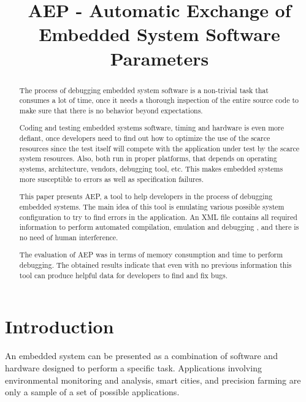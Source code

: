 \documentclass[conference]{IEEEtran}
\begin{document}
\title{AEP - Automatic Exchange of Embedded System Software Parameters}

\author{
}
\maketitle

\begin{abstract}
The process of debugging  embedded system software is a non-trivial task that consumes a lot of time, once it needs a thorough inspection of the entire source code to make sure that there is no behavior beyond expectations.

Coding and testing embedded systems software, timing and hardware is even more defiant, once developers need to find out how to optimize the use of the scarce resources since the test itself will compete with the application under test by the scarce system resources. Also, both run in proper platforms, that depends on operating systems, architecture, vendors, debugging tool, etc. This makes embedded systems more susceptible to errors as well as specification failures.

This paper presents AEP, a tool to help developers in the process of debugging embedded systems. The main idea of this tool is emulating various possible system configuration to try to find errors in the application.  An XML file contains all required information to perform automated compilation, emulation and debugging , and there is no need of human interference.

The evaluation of AEP was in terms of memory consumption and time to perform debugging. The obtained results indicate that even with no previous information this tool can produce helpful data for developers to find and fix bugs.

\end{abstract}

\section{Introduction}
An embedded system can be presented as a combination of software and hardware designed to perform a specific task.  Applications involving environmental monitoring and analysis, smart cities, and precision farming are only a sample of a set of possible applications.
\end{document}
